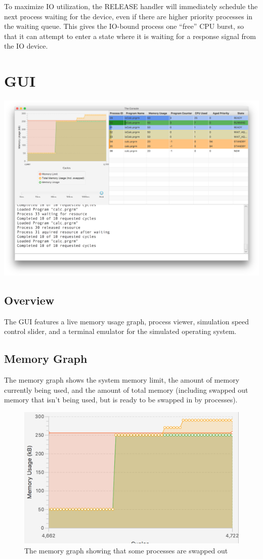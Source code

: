 \documentclass[paper=a4, fontsize=11pt]{scrartcl} %
\numberwithin{equation}{section} %
\numberwithin{figure}{section} %
\numberwithin{table}{section} %
\begin{document}
To maximize IO utilization, the RELEASE handler will immediately schedule the next process waiting for the device, even if there are higher priority processes in the waiting queue. This gives the IO-bound process one ``free'' CPU burst, so that it can attempt to enter a state where it is waiting for a response signal from the IO device.

\section{GUI}
\includegraphics[width=\textwidth]{Demo.png}
\subsection{Overview}
The GUI features a live memory usage graph, process viewer, simulation speed control slider, and a terminal emulator for the simulated operating system. 


\subsection{Memory Graph}
The memory graph shows the system memory limit, the amount of memory currently being used, and the amount of total memory (including swapped out memory that isn't being used, but is ready to be swapped in by processes).
\begin{figure}[H]
  \centering
    \includegraphics[scale=.5]{MemoryGraph.png}
  \caption{The memory graph showing that some processes are swapped out}
\end{figure}
\end{document}
